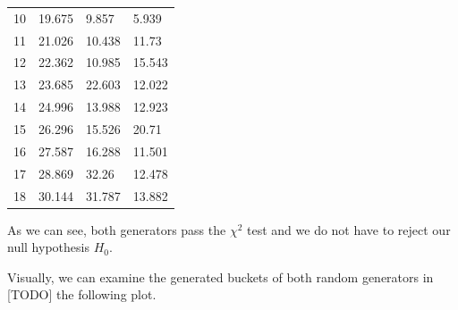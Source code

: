 \documentclass[
]{article}
\begin{document}
\begin{table}[]
\begin{tabular}{llll}
10                             & 19.675                                                            & 9.857                                      & 5.939                                         \\
\rowcolor[HTML]{D9E1F2} 
11                             & 21.026                                                            & 10.438                                     & 11.73                                         \\
12                             & 22.362                                                            & 10.985                                     & 15.543                                        \\
\rowcolor[HTML]{D9E1F2} 
13                             & 23.685                                                            & 22.603                                     & 12.022                                        \\
14                             & 24.996                                                            & 13.988                                     & 12.923                                        \\
\rowcolor[HTML]{D9E1F2} 
15                             & 26.296                                                            & 15.526                                     & 20.71                                         \\
16                             & 27.587                                                            & 16.288                                     & 11.501                                        \\
\rowcolor[HTML]{D9E1F2} 
17                             & 28.869                                                            & \cellcolor[HTML]{F8CBAD}32.26              & 12.478                                        \\
18                             & 30.144                                                            & \cellcolor[HTML]{F8CBAD}31.787             & 13.882                                       
\end{tabular}
\end{table}

As we can see, both generators pass the \(\chi^2\) test and we do not
have to reject our null hypothesis \(H_0\).

Visually, we can examine the generated buckets of both random generators
in {[}TODO{]} the following plot.
\end{document}
